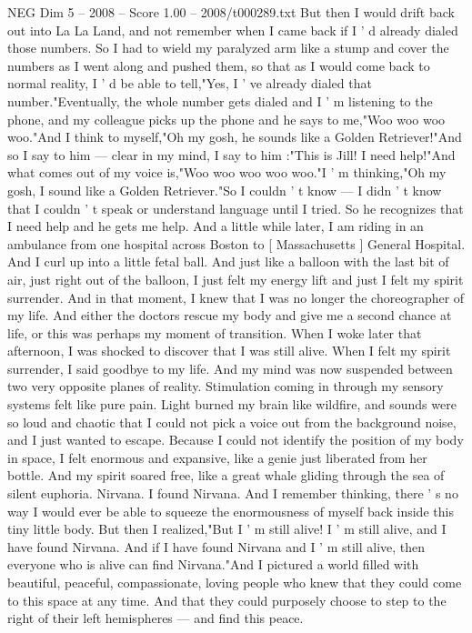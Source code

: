 \begin{textsample}{NEG Dim 5 – 2008 – Score 1.00 – 2008/t000289.txt}
But then I would drift back out into La La Land, and not remember when I came back if I ' d already dialed those numbers.
So I had to wield my paralyzed arm like a stump and cover the numbers as I went along and pushed them, so that as I would come back to normal reality, I ' d be able to tell,"Yes, I ' ve already dialed that number."Eventually, the whole number gets dialed and I ' m listening to the phone, and my colleague picks up the phone and he says to me,"Woo woo woo woo."And I think to myself,"Oh my gosh, he sounds like a Golden Retriever!"And so I say to him — clear in my mind, I say to him :"This is Jill!
I need help!"And what comes out of my voice is,"Woo woo woo woo woo."I ' m thinking,"Oh my gosh, I sound like a Golden Retriever."So I couldn ' t know — I didn ' t know that I couldn ' t speak or understand language until I tried.
So he recognizes that I need help and he gets me help.
And a little while later, I am riding in an ambulance from one hospital across Boston to [ Massachusetts ] General Hospital.
And I curl up into a little fetal ball.
And just like a balloon with the last bit of air, just right out of the balloon, I just felt my energy lift and just I felt my spirit surrender.
And in that moment, I knew that I was no longer the choreographer of my life.
And either the doctors rescue my body and give me a second chance at life, or this was perhaps my moment of transition.
When I woke later that afternoon, I was shocked to discover that I was still alive.
When I felt my spirit surrender, I said goodbye to my life.
And my mind was now suspended between two very opposite planes of reality.
Stimulation coming in through my sensory systems felt like pure pain.
Light burned my brain like wildfire, and sounds were so loud and chaotic that I could not pick a voice out from the background noise, and I just wanted to escape.
Because I could not identify the position of my body in space, I felt enormous and expansive, like a genie just liberated from her bottle.
And my spirit soared free, like a great whale gliding through the sea of silent euphoria.
Nirvana.
I found Nirvana.
And I remember thinking, there ' s no way I would ever be able to squeeze the enormousness of myself back inside this tiny little body.
But then I realized,"But I ' m still alive!
I ' m still alive, and I have found Nirvana.
And if I have found Nirvana and I ' m still alive, then everyone who is alive can find Nirvana."And I pictured a world filled with beautiful, peaceful, compassionate, loving people who knew that they could come to this space at any time.
And that they could purposely choose to step to the right of their left hemispheres — and find this peace.

\end{textsample}
